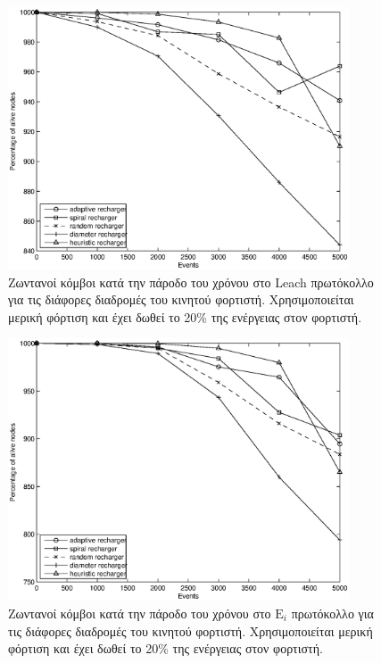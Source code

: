 \begin{figure}[H]
  \centering
  \includegraphics[width=0.9\textwidth]{experiments/classic/4.ourVSnaive/alive_nodes_leach_rc_per_our-spiral-random-diameter-heuristic.eps}
  \caption{Ζωντανοί κόμβοι κατά την πάροδο του χρόνου στο Leach πρωτόκολλο για τις διάφορες διαδρομές του κινητού φορτιστή. Χρησιμοποιείται μερική φόρτιση και έχει
δωθεί το 20\% της ενέργειας στον φορτιστή.}
  \label{fig:4exp_1_2}
\end{figure}

\begin{figure}[H]
  \centering
  \includegraphics[width=0.9\textwidth]{experiments/classic/4.ourVSnaive/alive_nodes_ei_rc_per_our-spiral-random-diameter-heuristic.eps}
  \caption{Ζωντανοί κόμβοι κατά την πάροδο του χρόνου στο $\text{E}_{i}$ πρωτόκολλο για τις διάφορες διαδρομές του κινητού φορτιστή. Χρησιμοποιείται μερική φόρτιση
και έχει δωθεί το 20\% της ενέργειας στον φορτιστή.}
  \label{fig:4exp_1_3}
\end{figure}



